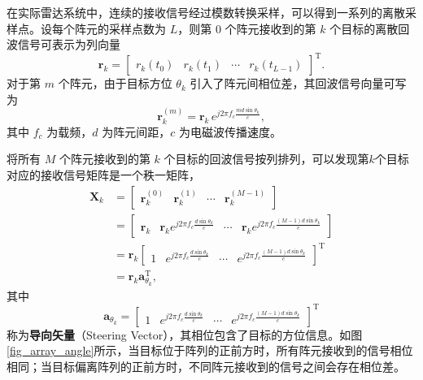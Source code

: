 在实际雷达系统中，连续的接收信号经过模数转换采样，可以得到一系列的离散采样点。设每个阵元的采样点数为 \(L\)，则第 \(0\) 个阵元接收到的第 \(k\) 个目标的离散回波信号可表示为列向量
\[
    \bm{r}_k =
    \begin{bmatrix}
        r_k(t_0) & r_k(t_1) & \cdots & r_k(t_{L-1})
    \end{bmatrix}^{\mathrm{T}}.
\]
对于第 \(m\) 个阵元，由于目标方位 \(\theta_k\) 引入了阵元间相位差，其回波信号向量可写为
\[
    \bm{r}^{(m)}_k
    = \bm{r}_k \, e^{j 2 \pi f_c \frac{m d \sin\theta_k}{c}},
\]
其中 \(f_c\) 为载频，\(d\) 为阵元间距，\(c\) 为电磁波传播速度。

将所有 \(M\) 个阵元接收到的第 \(k\) 个目标的回波信号按列排列，可以发现第\( k \)个目标对应的接收信号矩阵是一个秩一矩阵，
\[
    \begin{aligned}
        \mathbf{X}_k
         & = \begin{bmatrix}
                 \bm{r}_k^{(0)} & \bm{r}_k^{(1)} & \cdots & \bm{r}_k^{(M-1)}
             \end{bmatrix}                                                           \\
         & = \begin{bmatrix}
                 \bm{r}_k & \bm{r}_k e^{j 2 \pi f_c \frac{d \sin\theta_k}{c}} & \cdots & \bm{r}_k e^{j 2 \pi f_c \frac{(M-1) d \sin\theta_k}{c}}
             \end{bmatrix} \\
         & = \bm{r}_k
        \begin{bmatrix}
            1 & e^{j 2 \pi f_c \frac{d \sin\theta_k}{c}} & \cdots & e^{j 2 \pi f_c \frac{(M-1) d \sin\theta_k}{c}}
        \end{bmatrix}^{\mathrm{T}}                               \\
         & = \bm{r}_k \bm{a}_{\theta_k}^{\mathrm{T}},
    \end{aligned}
\]
其中
\[
    \bm{a}_{\theta_k} =
    \begin{bmatrix}
        1 & e^{j 2 \pi f_c \frac{d \sin\theta_k}{c}} & \cdots & e^{j 2 \pi f_c \frac{(M-1) d \sin\theta_k}{c}}
    \end{bmatrix}^{\mathrm{T}}
\]
称为\textbf{导向矢量}（Steering Vector），其相位包含了目标的方位信息。如图\ref{fig_array_angle}所示，当目标位于阵列的正前方时，所有阵元接收到的信号相位相同；当目标偏离阵列的正前方时，不同阵元接收到的信号之间会存在相位差。

